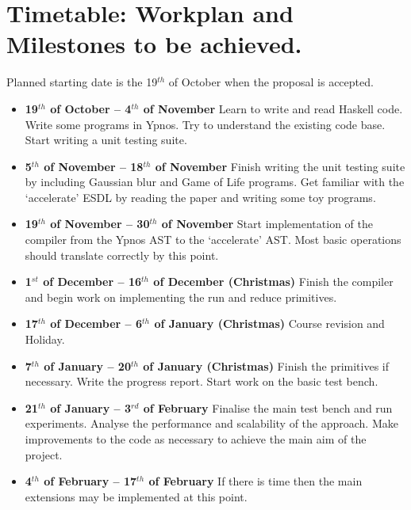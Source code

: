 \section*{Timetable: Workplan and Milestones to be achieved.}

Planned starting date is the 19$^{th}$ of October when the proposal is
accepted.

\begin{itemize}

\item \textbf{19$^{th}$ of October -- 4$^{th}$ of November} Learn to write and read
Haskell code.  Write some programs in Ypnos. Try to understand the existing
code base.  Start writing a unit testing suite.

\item \textbf{5$^{th}$ of November -- 18$^{th}$ of November} Finish writing the unit
testing suite by including Gaussian blur and Game of Life programs. Get
familiar with the `accelerate' ESDL by reading the paper and writing some toy
programs.

\item \textbf{19$^{th}$ of November -- 30$^{th}$ of November} Start
implementation of the compiler from the Ypnos AST to the `accelerate' AST.
Most basic operations should translate correctly by this point.

\item \textbf{1$^{st}$ of December -- 16$^{th}$ of December (Christmas)} Finish
the compiler and begin work on implementing the run and reduce primitives.

\item \textbf{17$^{th}$ of December -- 6$^{th}$ of January (Christmas)} Course
revision and Holiday.

\item \textbf{7$^{th}$ of January -- 20$^{th}$ of January (Christmas)} Finish the
primitives if necessary.  Write the progress report.  Start work on the basic
test bench.

\item \textbf{21$^{th}$ of January -- 3$^{rd}$ of February} Finalise the main
test bench and run experiments.  Analyse the performance and scalability of the
approach.  Make improvements to the code as necessary to achieve the main aim
of the project.

\item \textbf{4$^{th}$ of February -- 17$^{th}$ of February} If there is time then
the main extensions may be implemented at this point.


\end{itemize}
